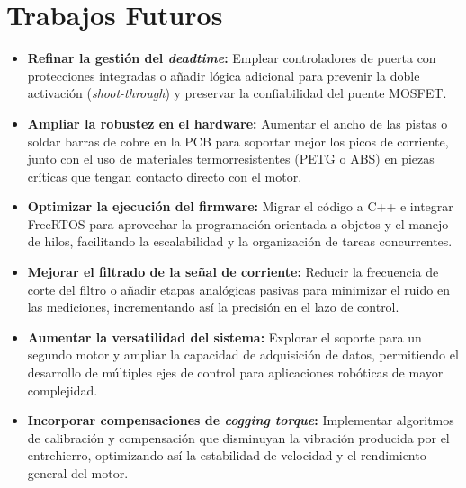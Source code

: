 \documentclass[11pt]{report}
\begin{document}
\section*{Trabajos Futuros}
\begin{itemize}
	\item \textbf{Refinar la gestión del \emph{deadtime}:} Emplear controladores de puerta con protecciones integradas o añadir lógica adicional para prevenir la doble activación (\emph{shoot-through}) y preservar la confiabilidad del puente MOSFET.

	\item \textbf{Ampliar la robustez en el hardware:} Aumentar el ancho de las pistas o soldar barras de cobre en la PCB para soportar mejor los picos de corriente, junto con el uso de materiales termorresistentes (PETG o ABS) en piezas críticas que tengan contacto directo con el motor.

	\item \textbf{Optimizar la ejecución del firmware:} Migrar el código a C++ e integrar FreeRTOS para aprovechar la programación orientada a objetos y el manejo de hilos, facilitando la escalabilidad y la organización de tareas concurrentes.

	\item \textbf{Mejorar el filtrado de la señal de corriente:} Reducir la frecuencia de corte del filtro o añadir etapas analógicas pasivas para minimizar el ruido en las mediciones, incrementando así la precisión en el lazo de control.

	\item \textbf{Aumentar la versatilidad del sistema:} Explorar el soporte para un segundo motor y ampliar la capacidad de adquisición de datos, permitiendo el desarrollo de múltiples ejes de control para aplicaciones robóticas de mayor complejidad.

	\item \textbf{Incorporar compensaciones de \emph{cogging torque}:} Implementar algoritmos de calibración y compensación que disminuyan la vibración producida por el entrehierro, optimizando así la estabilidad de velocidad y el rendimiento general del motor.
\end{itemize}

\href{https://www.youtube.com/watch?v=2yJgwwDcgV8}{\phantom{ASDF--------------------ASDF}}

\newpage
{}
\printbibliography
\end{document}
